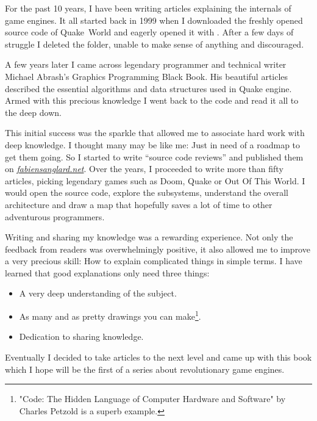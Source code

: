 \documentclass[book.tex]{subfiles}
\begin{document}
For the past 10 years, I have been writing articles explaining the internals of game engines. It all started back in 1999 when I downloaded the freshly opened source code of \mbox{Quake World} and eagerly opened it with . After a few days of struggle I deleted the  folder, unable to make sense of anything and discouraged.

\bigskip

A few years later I came across legendary programmer and technical writer Michael Abrash's Graphics Programming Black Book. His beautiful articles described the essential algorithms and data structures used in Quake engine. Armed with this precious knowledge I went back to the code and read it all to the deep down.

\bigskip

This initial success was the sparkle that allowed me to associate hard work with deep knowledge. I thought many may be like me: Just in need of a roadmap to get them going. So I started to write ``source  code reviews'' and published them on 
\href{http://fabiensanglard.net}{\textit{fabiensanglard.net}}. Over the years, I proceeded to write more than fifty articles,  picking legendary games such as Doom, Quake or Out Of This World. I would open the source code, explore the subsystems, understand the overall architecture and draw a map that hopefully saves a lot of time to other adventurous programmers.

\bigskip

Writing and sharing my knowledge was a rewarding experience. Not only the feedback from readers was overwhelmingly positive, it also allowed me to improve a very precious skill: How to explain complicated things in simple terms. I have learned that good explanations only need three things: 
\begin{itemize} 
\item A very deep understanding of the subject. 
\item As many and as pretty drawings you can make\footnote{"Code: The Hidden Language of Computer Hardware and Software" by Charles Petzold is a superb example.}.
\item Dedication to sharing knowledge.
\end{itemize} 

\bigskip

Eventually I decided to take articles to the next level and came up with this book which I hope will be the first of a series about revolutionary game engines. 
\end{document}
